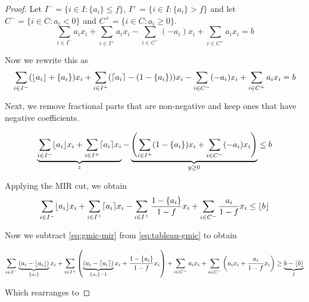 \begin{proof}
Let $I^- = \{ i \in I : \{a_i\} \leq f\}$, $I^+ = \{i \in I : \{a_i\}> f\}$ and let $C^-  = \{i \in C : a_i < 0\}$ and $C^+ = \{ i \in C : a_i \geq 0\}$.
\begin{equation*}
\label{eq:tableau-gmic}
\sum_{i \in I^{-}} a_ix_i + \sum_{i \in I^+} a_i x_i - \sum_{i \in C^-}(-a_i) x_i + \sum_{i \in C^+} a_i x_i = b
\end{equation*}

Now we rewrite this as
\begin{equation*}
\sum_{i \in I^{-}} (\lfloor a_i \rfloor + \{a_i\} )x_i + \sum_{i \in I^+} (\lceil a_i \rceil - (1- \{a_i\})) x_i   - \sum_{i \in C^-}(-a_i) x_i + \sum_{i \in C^+} a_i x_i = b
\end{equation*}

Next, we remove fractional parts that are non-negative and keep ones that have negative coefficients.

\begin{equation}
\underbrace{\sum_{i \in I^{-}} \lfloor a_i \rfloor x_i + \sum_{i \in I^+} \lceil a_i \rceil x_i }_{z} - \underbrace{\left( \sum_{i \in I^+}  (1- \{a_i\}) x_i   + \sum_{i \in C^-}(-a_i) x_i\right)}_{y \geq 0} \leq b
\end{equation}

Applying the MIR cut, we obtain
\begin{equation*}
\label{eq:gmic-mir}
\sum_{i \in I^{-}} \lfloor a_i \rfloor x_i + \sum_{i \in I^+} \lceil a_i \rceil x_i - \sum_{i \in I^+}  \frac{1- \{a_i\}}{1-f} x_i   +  \sum_{i \in C^-}\frac{a_i}{1-f} x_i \leq \lfloor b \rfloor
\end{equation*}

Now we subtract \eqref{eq:gmic-mir} from \eqref{eq:tableau-gmic} to obtain

\begin{equation*}
\label{eq:gmic-close}
\sum_{i \in I^{-}} \underbrace{(a_i - \lfloor a_i \rfloor)}_{\{a_i\}}x_i + \sum_{i \in I^+}\left( \underbrace{(a_i - \lceil a_i \rceil)}_{\{a_i\} - 1}x_i +  \frac{1- \{a_i\}}{1-f} x_i   \right)+ \sum_{i \in C^+} a_i x_i + \sum_{i \in C^-} \left( a_i x_i +\frac{a_i}{1-f} x_i \right)\geq \underbrace{b - \lfloor b \rfloor}_{f}
\end{equation*}

Which rearranges to 



\end{proof}
